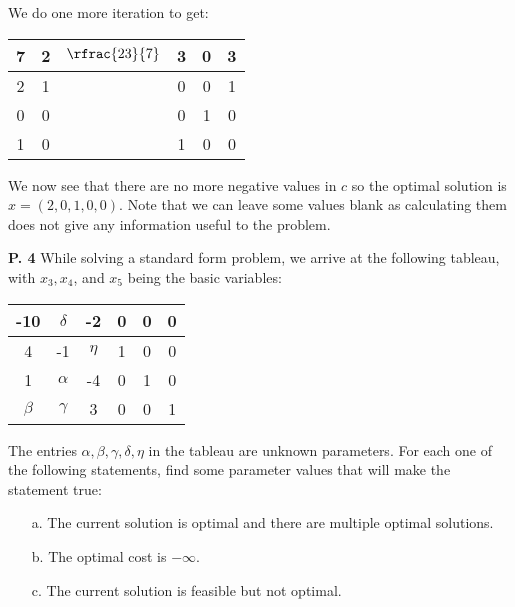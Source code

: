 \documentclass{article}
\begin{document}
\begin{jacklist}
\begin{center}
\begin{tabular}{|c|ccccc|}
            \hline
        \end{tabular}
    \end{center}
    We do one more iteration to get:
    \begin{center}
        \begin{tabular}{|c|ccccc|}
            \hline
            7&2&$\rfrac{23}{7}$&3&0&3\\
            \hline
            2&1&&0&0&1\\
            0&0&&0&1&0\\
            1&0&&1&0&0\\
            \hline
        \end{tabular}
    \end{center}
    We now see that there are no more negative values in $c$ so the optimal solution is $x = (2,0,1,0,0)$. Note that we can leave some
    values blank as calculating them does not give any information useful to the problem. 
\newpage
    \begin{framed} 
    \item [\textbf{P. 4}] While solving a standard form problem, we arrive at the following tableau, with $x_{3}, x_{4}$, and $x_{5}$ 
        being the basic variables: 
        \begin{center}
        \begin{tabular}{|c|ccccc|}
            \hline-10 & $\delta$ & -2 & 0 & 0 & 0 \\
            \hline 4 & -1 & $\eta$ & 1 & 0 & 0 \\
            1 & $\alpha$ & -4 & 0 & 1 & 0 \\
            $\beta$ & $\gamma$ & 3 & 0 & 0 & 1 \\
            \hline
        \end{tabular}
        \end{center}
        The entries $\alpha, \beta, \gamma, \delta, \eta$ in the tableau are unknown parameters. 
        For each one of the following statements, find some parameter values that will make the statement true:
        \begin{itemize}
            \item [a.] The current solution is optimal and there are multiple optimal solutions.
            \item [b.] The optimal cost is $-\infty$.
            \item [c.] The current solution is feasible but not optimal.
        \end{itemize}
    \end{framed}

\end{jacklist}
\end{document}
